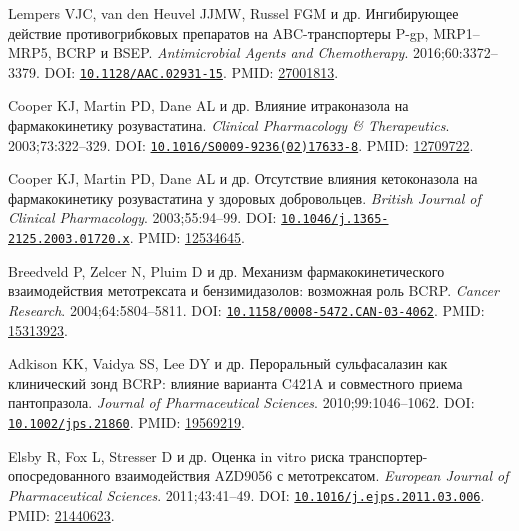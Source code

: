 \documentclass[11pt]{article}
\begin{document}
\begin{description}[before={\microtypesetup{expansion=false}\setlength{\RaggedRightRightskip}{0pt plus 4em}\RaggedRight}]
\item[{[68]}] Lempers VJC, van den Heuvel JJMW, Russel FGM и др. Ингибирующее действие противогрибковых препаратов на ABC-транспортеры P-gp, MRP1--MRP5, BCRP и BSEP. \textit{\foreignlanguage{english}{Antimicrobial Agents and Chemotherapy}}. 2016;60:3372--3379. DOI: \href{https://doi.org/10.1128/AAC.02931-15}{\nolinkurl{10.1128/AAC.02931-15}}. PMID: \href{https://pubmed.ncbi.nlm.nih.gov/27001813/}{27001813}.
\item[{[69]}] Cooper KJ, Martin PD, Dane AL и др. Влияние итраконазола на фармакокинетику розувастатина. \textit{\foreignlanguage{english}{Clinical Pharmacology \& Therapeutics}}. 2003;73:322--329. DOI: \href{https://doi.org/10.1016/S0009-9236(02)17633-8}{\nolinkurl{10.1016/S0009-9236(02)17633-8}}. PMID: \href{https://pubmed.ncbi.nlm.nih.gov/12709722/}{12709722}.
\item[{[70]}] Cooper KJ, Martin PD, Dane AL и др. Отсутствие влияния кетоконазола на фармакокинетику розувастатина у здоровых добровольцев. \textit{\foreignlanguage{english}{British Journal of Clinical Pharmacology}}. 2003;55:94--99. DOI: \href{https://doi.org/10.1046/j.1365-2125.2003.01720.x}{\nolinkurl{10.1046/j.1365-2125.2003.01720.x}}. PMID: \href{https://pubmed.ncbi.nlm.nih.gov/12534645/}{12534645}.
\item[{[71]}] Breedveld P, Zelcer N, Pluim D и др. Механизм фармакокинетического взаимодействия метотрексата и бензимидазолов: возможная роль BCRP. \textit{\foreignlanguage{english}{Cancer Research}}. 2004;64:5804--5811. DOI: \href{https://doi.org/10.1158/0008-5472.CAN-03-4062}{\nolinkurl{10.1158/0008-5472.CAN-03-4062}}. PMID: \href{https://pubmed.ncbi.nlm.nih.gov/15313923/}{15313923}.
\item[{[72]}] Adkison KK, Vaidya SS, Lee DY и др. Пероральный сульфасалазин как клинический зонд BCRP: влияние варианта C421A и совместного приема пантопразола. \textit{\foreignlanguage{english}{Journal of Pharmaceutical Sciences}}. 2010;99:1046--1062. DOI: \href{https://doi.org/10.1002/jps.21860}{\nolinkurl{10.1002/jps.21860}}. PMID: \href{https://pubmed.ncbi.nlm.nih.gov/19569219/}{19569219}.
\item[{[73]}] Elsby R, Fox L, Stresser D и др. Оценка in vitro риска транспортер-опосредованного взаимодействия AZD9056 с метотрексатом. \textit{\foreignlanguage{english}{European Journal of Pharmaceutical Sciences}}. 2011;43:41--49. DOI: \href{https://doi.org/10.1016/j.ejps.2011.03.006}{\nolinkurl{10.1016/j.ejps.2011.03.006}}. PMID: \href{https://pubmed.ncbi.nlm.nih.gov/21440623/}{21440623}.

\end{description}
\end{document}
